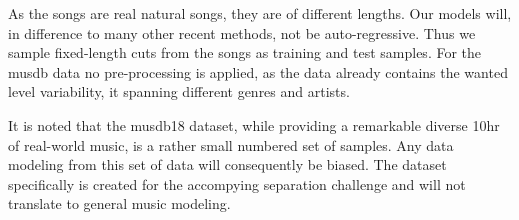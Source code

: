 As the songs are real natural songs, they are of different lengths. Our models will, in difference to many other recent methods, not be auto-regressive. Thus we sample fixed-length cuts from the songs as training and test samples. For the musdb data no pre-processing is applied, as the data already contains the wanted level variability, it spanning different genres and artists.

It is noted that the musdb18 dataset, while providing a remarkable diverse 10hr of real-world music, is a rather small numbered set of samples. Any data modeling from this set of data will consequently be biased. The dataset specifically is created for the accompying separation challenge and will not translate to general music modeling.
